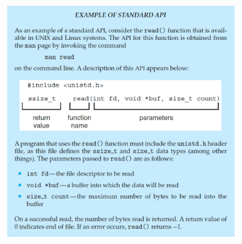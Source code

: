 \documentclass[12pt]{article}
\begin{document}
\begin{center}
    \includegraphics[width = 0.75\textwidth]{Images/5.PNG}
\end{center}
\end{document}
